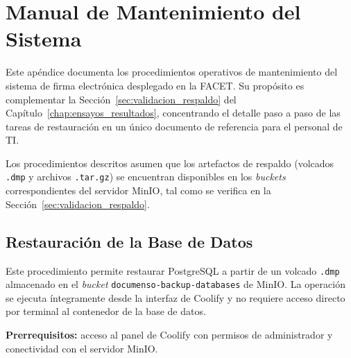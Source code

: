 \chapter{Manual de Mantenimiento del Sistema}
\label{AppendixC}
\label{AppendixC:Manual}

Este apéndice documenta los procedimientos operativos de mantenimiento del sistema de firma electrónica desplegado en la FACET. Su propósito es complementar la Sección~\ref{sec:validacion_respaldo} del Capítulo~\ref{chap:ensayos_resultados}, concentrando el detalle paso a paso de las tareas de restauración en un único documento de referencia para el personal de TI.

Los procedimientos descritos asumen que los artefactos de respaldo (volcados \texttt{.dmp} y archivos \texttt{.tar.gz}) se encuentran disponibles en los \textit{buckets} correspondientes del servidor MinIO, tal como se verifica en la Sección~\ref{sec:validacion_respaldo}.


\section{Restauración de la Base de Datos}
\label{AppendixC:RestauracionBD}

Este procedimiento permite restaurar PostgreSQL a partir de un volcado \texttt{.dmp} almacenado en el \textit{bucket} \texttt{documenso-backup-databases} de MinIO. La operación se ejecuta íntegramente desde la interfaz de Coolify y no requiere acceso directo por terminal al contenedor de la base de datos.

\textbf{Prerrequisitos:} acceso al panel de Coolify con permisos de administrador y conectividad con el servidor MinIO.

